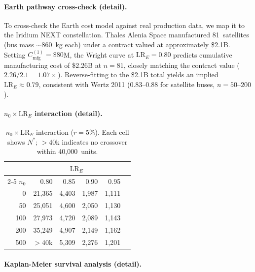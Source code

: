 \documentclass[preprint,12pt]{elsarticle}
\begin{document}
\paragraph{Earth pathway cross-check (detail).} To cross-check the Earth cost model against real production data, we map it to the Iridium NEXT constellation. Thales Alenia Space manufactured 81~satellites (bus mass $\sim$860~kg each) under a contract valued at approximately \$2.1B. Setting $C_{\mathrm{mfg}}^{(1)} = \$80$M, the Wright curve at $\mathrm{LR}_E = 0.80$ predicts cumulative manufacturing cost of \$2.26B at $n = 81$, closely matching the contract value ($2.26/2.1 = 1.07\times$). Reverse-fitting to the \$2.1B total yields an implied $\mathrm{LR}_E \approx 0.79$, consistent with Wertz 2011 \cite{wertz2011} (0.83--0.88 for satellite buses, $n = 50$--$200$).

\paragraph{$n_0 \times \mathrm{LR}_E$ interaction (detail).}

\begin{table}[htbp]
\centering
\caption{$n_0 \times \mathrm{LR}_E$ interaction ($r = 5\%$). Each cell shows $N^*$; $>$40k indicates no crossover within 40{,}000~units.}
\label{tab:n0_lr_interaction}
\small
\begin{tabular}{@{}rrrrrr@{}}
\toprule
 & \multicolumn{4}{c}{$\mathrm{LR}_E$} \\
\cmidrule(l){2-5}
$n_0$ & 0.80 & 0.85 & 0.90 & 0.95 \\
\midrule
0   & 21{,}365 & 4{,}403 & 1{,}987 & 1{,}111 \\
50  & 25{,}051 & 4{,}600 & 2{,}050 & 1{,}130 \\
100 & 27{,}973 & 4{,}720 & 2{,}089 & 1{,}143 \\
200 & 35{,}249 & 4{,}907 & 2{,}149 & 1{,}162 \\
500 & $>$40k   & 5{,}309 & 2{,}276 & 1{,}201 \\
\bottomrule
\end{tabular}
\end{table}

\paragraph{Kaplan-Meier survival analysis (detail).}
\end{document}
